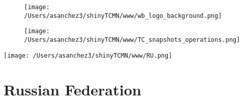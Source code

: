 \documentclass{article}\usepackage[]{graphicx}\usepackage[]{color}
\begin{document}
%

\begin{figure}
  \vspace{-3ex} %
  \hspace{-7ex} %
  \texttt{[image: /Users/asanchez3/shinyTCMN/www/wb\_logo\_background.png]}
\end{figure}
\begin{figure}
  \begin{minipage}[t]{0.99\textwidth} %
      \vspace{-30ex}
      \hspace{-2ex}
      \raggedright{\texttt{[image: /Users/asanchez3/shinyTCMN/www/TC\_snapshots\_operations.png]}}
  \end{minipage}
\end{figure}
%
\begin{minipage}[t]{0.99\textwidth} %
  \vspace{-1.5cm}
  \begin{minipage}[c]{0.36\textwidth} 
    \begin{minipage}[c]{0.28\textwidth} %
      \texttt{[image: /Users/asanchez3/shinyTCMN/www/RU.png]}
    \end{minipage}
    \begin{minipage}[c]{0.70\textwidth} %
      \section*{\color{blue!40!black}Russian Federation}
    \end{minipage}
  \end{minipage}
  \begin{minipage}[c]{0.63\textwidth}
  \end{minipage}  
\end{minipage} %
\end{document}
